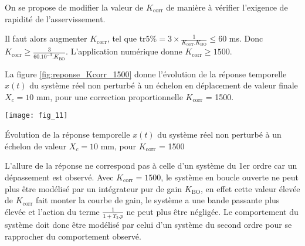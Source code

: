 \ifprof
\else
\vspace*{1em}
On se propose de modifier la valeur de $K_{\text{corr}}$ de manière à vérifier l'exigence de rapidité de l'asservissement.
\fi


\ifprof
\begin{corrige}
Il faut alors augmenter $K_{\text{corr}}$, tel que tr$5\% = 3 \times \frac{1}{K_{\text{corr}}.K_{\text{BO}}} \le 60$ ms. Donc \\
$K_{\text{corr}} \ge \frac{3}{60.10^{-3}.K_{\text{BO}}}$.
L'application numérique donne $K_{\text{corr}} \ge  1500$.
\end{corrige}
\fi


\ifprof
\else
La figure \ref{fig:reponse_Kcorr_1500}  donne l'évolution de la réponse temporelle $x(t)$ du système réel non perturbé à un échelon en déplacement de valeur finale $X_c = 10$ mm, pour une correction proportionnelle $K_{\text{corr}}$ = \num{1500}.


\begin{marginfigure}%


\texttt{[image: fig\_11]}
   \caption{{ Évolution de la réponse temporelle $x(t)$ du système réel non perturbé à un échelon de valeur $X_c = 10$ mm, pour $K_{\text{corr}}$ = \num{1500}}\label{fig:reponse_Kcorr_1500}}
\end{marginfigure}
\fi



\ifprof
\begin{corrige}
L'allure de la réponse ne correspond pas à celle d'un système du 1er ordre car un dépassement est observé. Avec $K_{\text{corr}} = 1500$, le système en boucle ouverte ne peut plus être modélisé par un intégrateur pur de gain $K_{\text{BO}}$, en effet cette valeur élevée de $K_{\text{corr}}$ fait monter la courbe de gain, le système a une bande passante plus élevée et l'action du terme $\frac{1}{1+T_2.p}$ ne peut plus être négligée. Le comportement du système doit donc être modélisé par celui d'un système du second ordre pour se rapprocher du comportement observé.
\end{corrige}
\fi

